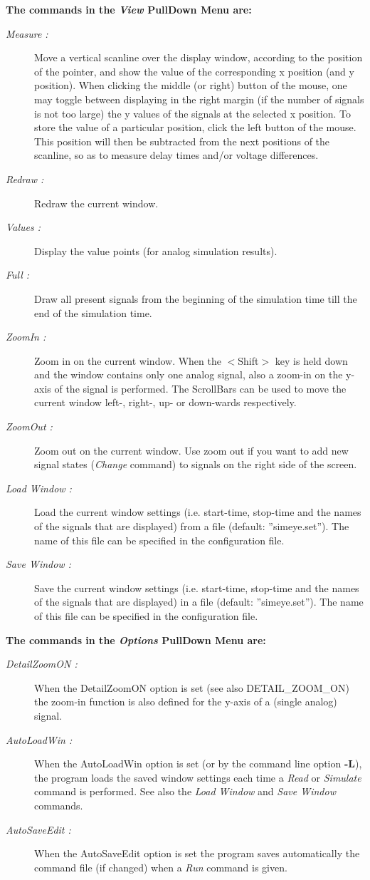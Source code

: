 {\bf The commands in the {\it View} PullDown Menu are:}
\begin{description}
\item [{\it Measure :}]
Move a vertical scanline over the display window,
according to the position of the pointer,
and show the value of the corresponding x position (and y position).
When clicking the middle (or right) button of the mouse, one
may toggle between displaying
in the right margin (if the number of signals is not too large)
the y values of the signals at the selected x position.
To store the value of a particular position, click the left 
button of the mouse.
This position will then be subtracted from
the next positions of the scanline,
so as to measure delay times and/or voltage differences.
\item [{\it Redraw :}]
Redraw the current window.
\item [{\it Values :}]
Display the value points (for analog simulation results).
\item [{\it Full :}]
Draw all present signals from the beginning of the simulation
time till the end of the simulation time.
\item [{\it ZoomIn :}]
Zoom in on the current window.
When the $<$Shift$>$ key is held down and the window contains only
one analog signal,
also a zoom-in on the y-axis of the signal
is performed.
The ScrollBars can be used to
move the current window left-, right-, up- or down-wards
respectively.
\item [{\it ZoomOut :}]
Zoom out on the current window.
Use zoom out if you want to add new signal states ({\it Change} command)
to signals on the right side of the screen.
\item [{\it Load Window :}]
Load the current window settings (i.e. start-time, stop-time
and the names of the signals that are displayed)
from a file (default: ''simeye.set'').
The name of this file can be specified in the configuration file.
\item [{\it Save Window :}]
Save the current window settings (i.e. start-time, stop-time
and the names of the signals that are displayed)
in a file (default: ''simeye.set'').
The name of this file can be specified in the configuration file.
\end{description}

{\bf The commands in the {\it Options} PullDown Menu are:}
\begin{description}
\item [{\it DetailZoomON :}]
When the DetailZoomON option is set (see also DETAIL\_ZOOM\_ON)
the zoom-in function is also defined for the y-axis of a (single analog) signal.
\item [{\it AutoLoadWin :}]
When the AutoLoadWin option is set (or by the command line option {\bf -L}),
the program  loads the saved window settings each time
a {\it Read} or {\it Simulate} command is performed.
See also the {\it Load Window} and {\it Save Window} commands.
\item [{\it AutoSaveEdit :}]
When the AutoSaveEdit option is set
the program  saves automatically the command file (if changed)
when a {\it Run} command is given.
\end{description}

